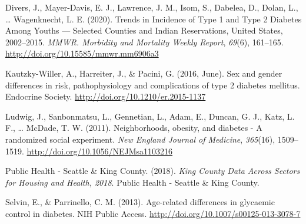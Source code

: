 \documentclass [11pt, proquest] {uwthesis}[2015/03/03]
\begin{document}
\hypertarget{ref-Divers2020}{}
Divers, J., Mayer-Davis, E. J., Lawrence, J. M., Isom, S., Dabelea, D.,
Dolan, L., \ldots{} Wagenknecht, L. E. (2020). Trends in Incidence of
Type 1 and Type 2 Diabetes Among Youths --- Selected Counties and Indian
Reservations, United States, 2002--2015. \emph{MMWR. Morbidity and
Mortality Weekly Report}, \emph{69}(6), 161--165.
\url{http://doi.org/10.15585/mmwr.mm6906a3}

\hypertarget{ref-Kautzky-Willer2016}{}
Kautzky-Willer, A., Harreiter, J., \& Pacini, G. (2016, June). Sex and
gender differences in risk, pathophysiology and complications of type 2
diabetes mellitus. Endocrine Society.
\url{http://doi.org/10.1210/er.2015-1137}

\hypertarget{ref-Ludwig2011}{}
Ludwig, J., Sanbonmatsu, L., Gennetian, L., Adam, E., Duncan, G. J.,
Katz, L. F., \ldots{} McDade, T. W. (2011). Neighborhoods, obesity, and
diabetes - A randomized social experiment. \emph{New England Journal of
Medicine}, \emph{365}(16), 1509--1519.
\url{http://doi.org/10.1056/NEJMsa1103216}

\hypertarget{ref-PublicHealth-SeattleandKingCounty2018}{}
Public Health - Seattle \& King County. (2018). \emph{King County Data
Across Sectors for Housing and Health, 2018}. Public Health - Seattle \&
King County.

\hypertarget{ref-Selvin2013}{}
Selvin, E., \& Parrinello, C. M. (2013). Age-related differences in
glycaemic control in diabetes. NIH Public Access.
\url{http://doi.org/10.1007/s00125-013-3078-7}
\end{document}
